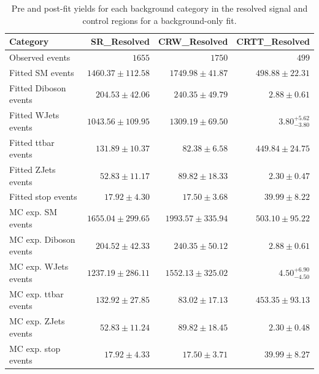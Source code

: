 \begin{table}
\centering
\small
\begin{tabular*}{\textwidth}{@{\extracolsep{\fill}}lrrr}
\toprule
\textbf{Category}           & SR\_Resolved            & CRW\_Resolved            & CRTT\_Resolved              \\
\midrule
Observed events          & $1655$              & $1750$              & $499$                    \\
\midrule
Fitted SM events         & $1460.37 \pm 112.58$          & $1749.98 \pm 41.87$          & $498.88 \pm 22.31$              \\
\midrule
        Fitted Diboson events         & $204.53 \pm 42.06$          & $240.35 \pm 49.79$          & $2.88 \pm 0.61$              \\
        Fitted WJets events         & $1043.56 \pm 109.95$          & $1309.19 \pm 69.50$          & $3.80_{-3.80}^{+5.62}$              \\
        Fitted ttbar events         & $131.89 \pm 10.37$          & $82.38 \pm 6.58$          & $449.84 \pm 24.75$              \\
        Fitted ZJets events         & $52.83 \pm 11.17$          & $89.82 \pm 18.33$          & $2.30 \pm 0.47$              \\
        Fitted stop events         & $17.92 \pm 4.30$          & $17.50 \pm 3.68$          & $39.99 \pm 8.22$              \\
 \midrule
MC exp. SM events              & $1655.04 \pm 299.65$          & $1993.57 \pm 335.94$          & $503.10 \pm 95.22$              \\
\midrule
        MC exp. Diboson events         & $204.52 \pm 42.33$          & $240.35 \pm 50.12$          & $2.88 \pm 0.61$              \\
        MC exp. WJets events         & $1237.19 \pm 286.11$          & $1552.13 \pm 325.02$          & $4.50_{-4.50}^{+6.90}$              \\
        MC exp. ttbar events         & $132.92 \pm 27.85$          & $83.02 \pm 17.13$          & $453.35 \pm 93.13$              \\
        MC exp. ZJets events         & $52.83 \pm 11.24$          & $89.82 \pm 18.45$          & $2.30 \pm 0.48$              \\
        MC exp. stop events         & $17.92 \pm 4.33$          & $17.50 \pm 3.71$          & $39.99 \pm 8.27$              \\
\bottomrule
\end{tabular*}
\caption{Pre and post-fit yields for each background category in the resolved signal and control regions for a background-only fit.}
\label{tab:yields_res}
\end{table}

